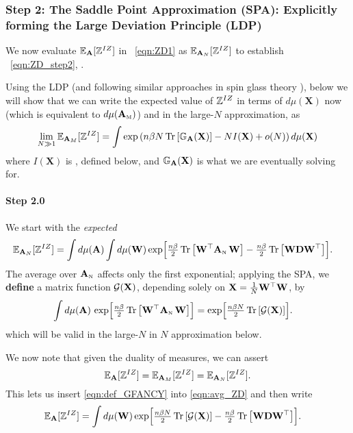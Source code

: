 \subsubsection{Step 2: The Saddle Point Approximation (SPA): Explicitly forming the Large Deviation Principle (LDP)}
\label{sxn:tanaka_step2}
We now evaluate $\mathbb{E}_{\mathbf{A}}[\mathbb{Z}^{IZ}]$ in \EQN~\ref{eqn:ZD1} as $\mathbb{E}_{\mathbf{A}_{N}}[\mathbb{Z}^{IZ}]$ 
to  establish \EQN~\ref{eqn:ZD_step2}, .

Using the LDP (and following similar approaches in spin glass theory \cite{PP95}),
below we will show that we can write the expected value of $\mathbb{Z}^{IZ}$ 
in terms of $d\mu(\mathbf{X})$ now (which is equivalent to $d\mu({\mathbf{A}}_{\text{\tiny M}})$)
and in the large-$N$ approximation, as
\begin{equation}
  \label{eqn:LDP}
 \lim_{N \gg 1} \mathbb{E}_{\mathbf{A}_{M}}[\mathbb{Z}^{IZ}]=
  \int\exp\left(n\beta N \mbox{}\operatorname{Tr}\left[\mathbb{G}_{\mathbf{A}}(\mathbf{X})\right]-NI(\mathbf{X})+o(N)\right)d\mu(\mathbf{X})
\end{equation}
where $I(\mathbf{X})$ is \RateFunction, defined below,
and $\mathbb{G}_{\mathbf{A}}(\mathbf{X})$ is what we are eventually solving for.

\paragraph{Step 2.0} We start with the \emph{expected} \PartitionFunction
\begin{align}
  \label{eqn:avg_ZD}
  \mathbb{E}_{\mathbf{A}_{N}}[\mathbb{Z}^{IZ}]
  &=
  \int d\mu(\mathbf{A})\int  d\mu({\mathbf{W}})
      \exp\Bigl[
         \tfrac{n\beta}{2}\mbox{}\operatorname{Tr}\left[{\mathbf{W}}^{\top}{\mathbf{A}}_{\text{\tiny N}}\,{\mathbf{W}}\right]
        -\tfrac{n\beta}{2}\mbox{}\operatorname{Tr}\left[{\mathbf{W}}\mathbf{D}{\mathbf{W}}^{\top}\right]
      \Bigr].
\end{align}
The average over ${\mathbf{A}}_{\text{\tiny N}}$ affects only the first exponential; applying the SPA, we
\textbf{define} a matrix function $\mathcal{G}(\mathbf{X})$, depending solely on
$\mathbf{X}=\frac1N{\mathbf{W}}^{\top}{\mathbf{W}}$, by
\begin{align}
  \label{eqn:def_GFANCY}
  \int d\mu(\mathbf{A})\,
        \exp\Bigl[\tfrac{n\beta}{2}\mbox{}\operatorname{Tr}\left[{\mathbf{W}}^{\top}{\mathbf{A}}_{\text{\tiny N}}\,{\mathbf{W}}\right]\Bigr]
  &=
  \exp\Bigl[\tfrac{n\beta N}{2}\mbox{}\operatorname{Tr}\left[\mathcal{G}(\mathbf{X})\right]\Bigr].
\end{align}
which will be valid in the large-$N$ in $N$ approximation below.

We now note that given the duality of measures, we can assert 
\begin{equation}
\mathbb{E}_{\mathbf{A}}[\mathbb{Z}^{IZ}]=\mathbb{E}_{\mathbf{A}_{M}}[\mathbb{Z}^{IZ}]=\mathbb{E}_{\mathbf{A}_{N}}[\mathbb{Z}^{IZ}].
\end{equation}
This lets us insert \eqref{eqn:def_GFANCY} into \eqref{eqn:avg_ZD} and then write
\begin{align}
  \label{eqn:ZD_after_Aavg}
  \mathbb{E}_{\mathbf{A}}[\mathbb{Z}^{IZ}]
  &=
  \int d\mu({\mathbf{W}})
      \exp\Bigl[
         \tfrac{n\beta N}{2}\mbox{}\operatorname{Tr}\left[\mathcal{G}(\mathbf{X})\right]
        -\tfrac{n\beta}{2}\mbox{}\operatorname{Tr}\left[{\mathbf{W}}\mathbf{D}{\mathbf{W}}^{\top}\right]
      \Bigr].
\end{align}

